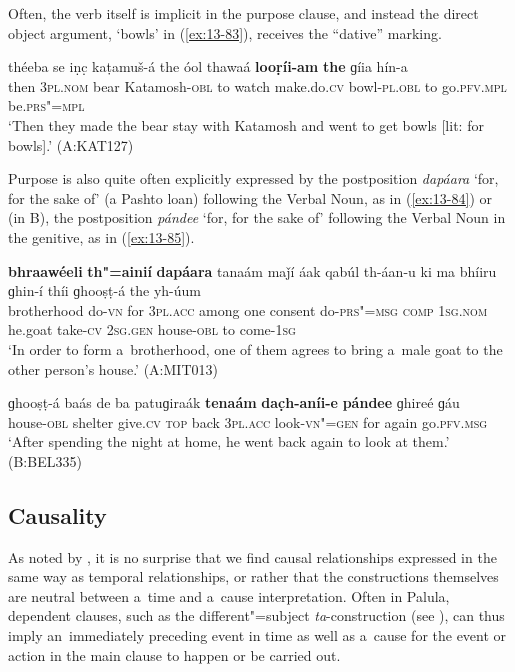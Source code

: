 Often, the verb itself is implicit in the purpose clause, and instead the direct object argument, `bowls' in (\ref{ex:13-83}), receives the ``dative'' marking.

\begin{exe}
\ex
\label{ex:13-83}
\gll théeba se iṇc̣ kaṭamuš-á the óol thawaá \textbf{looṛíi-am} \textbf{the} ɡíia hín-a \\
then \textsc{3pl.nom} bear Katamosh-\textsc{obl} to watch  make.do.\textsc{cv} bowl-\textsc{pl.obl} to go.\textsc{pfv.mpl} be.\textsc{prs"=mpl} \\
\glt `Then they made the bear stay with Katamosh and went to get bowls [lit: for bowls].' (A:KAT127) 
\end{exe}

Purpose is also quite often explicitly expressed by the postposition \textit{dapáara} `for, for the sake of' (a Pashto loan) following the Verbal Noun, as in (\ref{ex:13-84}) or (in B), the postposition \textit{pándee} `for, for the sake of' following the Verbal Noun in the genitive, as in (\ref{ex:13-85}).

\begin{exe}
\ex
\label{ex:13-84}
\gll \textbf{bhraawéeli} \textbf{th"=ainií} \textbf{dapáara} tanaám maǰí áak qabúl th-áan-u ki ma bhíiru ɡhin-í thíi ɡhooṣṭ-á the yh-úum \\
brotherhood do-\textsc{vn} for \textsc{3pl.acc} among one consent do-\textsc{prs"=msg} \textsc{comp} \textsc{1sg.nom} he.goat take-\textsc{cv} \textsc{2sg.gen}  house-\textsc{obl} to come-\textsc{1sg} \\
\glt `In order to form a~brotherhood, one of them agrees to bring a~male goat to the other person's house.' (A:MIT013)

\ex
\label{ex:13-85}
\gll ɡhooṣṭ-á baás de ba patuɡiraák \textbf{tenaám} \textbf{dac̣h-aníi-e} \textbf{pándee} ɡhireé ɡáu \\
house-\textsc{obl}  shelter give.\textsc{cv} \textsc{top} back \textsc{3pl.acc}  look-\textsc{vn"=gen} for again go.\textsc{pfv.msg} \\
\glt `After spending the night at home, he went back again to look at them.' (B:BEL335)
\end{exe}

\subsection{Causality}
\label{subsec:13-4-3}

As noted by \citet[247]{thompsonetal2007}, it is no surprise that we find causal relationships expressed in the same way as temporal relationships, or rather that the constructions themselves are neutral between a~time and a~cause interpretation. Often in Palula, dependent clauses, such as the different"=subject \textit{ta}-construction (see ), can thus imply an~immediately preceding event in time as well as a~cause for the event or action in the main clause to happen or be carried out. 



